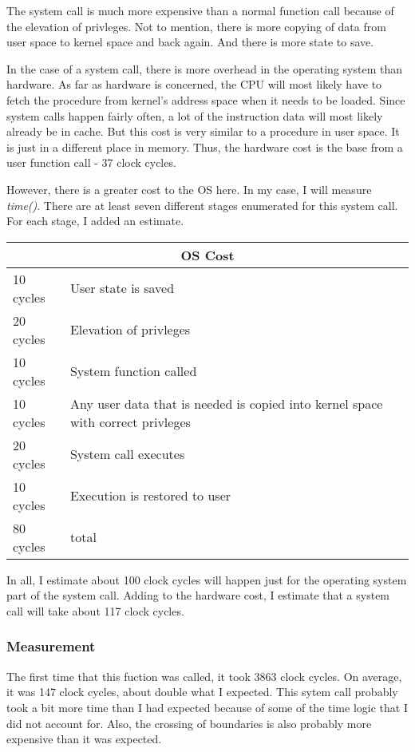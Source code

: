 \documentclass[paper=a4, fontsize=11pt]{scrartcl}
\numberwithin{equation}{section}        %
\numberwithin{figure}{section}          %
\numberwithin{table}{section}               %
\begin{document}
The system call is much more expensive than a normal function call because of the elevation of privleges.  Not to mention, there is more copying of data from user space to kernel space and back again.  And there is more state to save.

In the case of a system call, there is more overhead in the operating system than hardware.  As far as hardware is concerned, the CPU will most likely have to fetch the procedure from kernel's address space when it needs to be loaded.  Since system calls happen fairly often, a lot of the instruction data will most likely already be in cache.  But this cost is very similar to a procedure in user space.  It is just in a different place in memory.  Thus, the hardware cost is the base from a user function call - 37 clock cycles.

However, there is a greater cost to the OS here.  In my case, I will measure \textit{time()}.  There are at least seven different stages enumerated for this system call.  For each stage, I added an estimate.



\begin{tabular}{ |l|l| }
  \hline
  \multicolumn{2}{|c|}{OS Cost} \\
  \hline
  10 cycles & User state is saved \\
  20 cycles& Elevation of privleges \\
  10 cycles& System function called \\
  10 cycles& Any user data that is needed is copied into kernel space with correct privleges \\
  20 cycles& System call executes \\
  10 cycles& Execution is restored to user \\
  \hline
  80 cycles& total \\
  \hline
\end{tabular}


In all, I estimate about 100 clock cycles will happen just for the operating system part of the system call.  Adding to the hardware cost, I estimate that a system call will take about 117 clock cycles.

\subsubsection{Measurement}

The first time that this fuction was called, it took 3863 clock cycles.  On average, it was 147 clock cycles, about double what I expected.  This sytem call probably took a bit more time than I had expected because of some of the time logic that I did not account for.  Also, the crossing of boundaries is also probably more expensive than it was expected.
\end{document}
